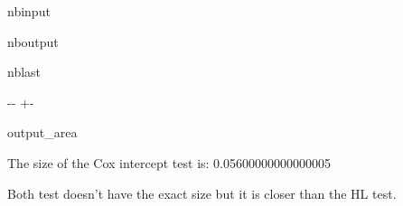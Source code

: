 \documentclass[letterpaper,10pt,english]{sphinxmanual}
\begin{document}
\begin{sphinxuseclass}{nbinput}
{
\begin{sphinxVerbatim}[commandchars=\\\{\}]
\llap{\color{nbsphinxin}[7]:\,\hspace{\fboxrule}\hspace{\fboxsep}}  \PYG{p}{[}\PYG{p}{]}
  \PYG{p}{[}\PYG{p}{]}
  \PYG{p}{[}\PYG{p}{]}
   
 
\end{sphinxVerbatim}
}

\end{sphinxuseclass}
\begin{sphinxuseclass}{nboutput}
\begin{sphinxuseclass}{nblast}
{

\kern-\sphinxverbatimsmallskipamount\kern-\baselineskip
\kern+\FrameHeightAdjust\kern-\fboxrule
\vspace{\nbsphinxcodecellspacing}

\begin{sphinxuseclass}{output_area}
\begin{sphinxuseclass}{}


\begin{sphinxVerbatim}[commandchars=\\\{\}]
The size of the Cox intercept test is:  0.05600000000000005
\end{sphinxVerbatim}



\end{sphinxuseclass}
\end{sphinxuseclass}
}

\end{sphinxuseclass}
\end{sphinxuseclass}
\sphinxAtStartPar
Both test doesn’t have the exact size but it is closer than the HL test.
\end{document}
